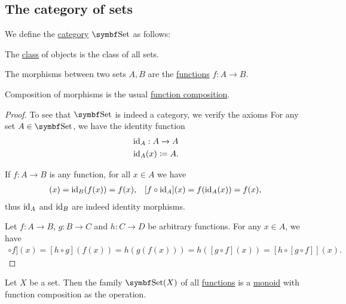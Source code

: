 \subsection{The category of sets}\label{subsec:category_of_sets}

\begin{definition}\label{def:category_of_sets}
  We define the \hyperref[def:category]{category} \( \Cat{Set} \) as follows:
  \begin{RefList}
     The \hyperref[def:set_zfc]{class} of objects is the class of all sets.

     The morphisms between two sets \( A, B \) are the \hyperref[def:function]{functions} \( f: A \to B \).

     Composition of morphisms is the usual \hyperref[def:function/composition]{function composition}.
  \end{RefList}
\end{definition}
\begin{proof}
  To see that \( \Cat{Set} \) is indeed a category, we verify the axioms
   For any set \( A \in \Cat{Set} \), we have the identity function
  \begin{align*}
     & \operatorname{id}_A: A \to A        \\
     & \operatorname{id}_A(x) \coloneqq A.
  \end{align*}

  If \( f: A \to B \) is any function, for all \( x \in A \) we have
  \begin{align*}
    [\Id_B \circ f](x) = \Id_B(f(x)) = f(x),
     &  &
    [f \circ \Id_A](x) = f(\Id_A(x)) = f(x),
  \end{align*}
  thus \( \operatorname{id}_A \) and \( \operatorname{id}_B \) are indeed identity morphisms.

   Let \( f: A \to B \), \( g: B \to C \) and \( h: C \to D \) be arbitrary functions. For any \( x \in A \), we have
  \begin{align*}
    [[h \circ g] \circ f](x)
    =
    [h \circ g](f(x))
    =
    h(g(f(x)))
    =
    h([g \circ f](x))
    =
    [h \circ [g \circ f]](x).
  \end{align*}
\end{proof}

\begin{corollary}\label{thm:functions_over_set_form_monoid}
  Let \( X \) be a set. Then the family \( \Cat{Set}(X) \) of all \hyperref[remark:category_obj_hom]{functions} is a \hyperref[def:magma/monoid]{monoid} with function composition as the operation.
\end{corollary}


